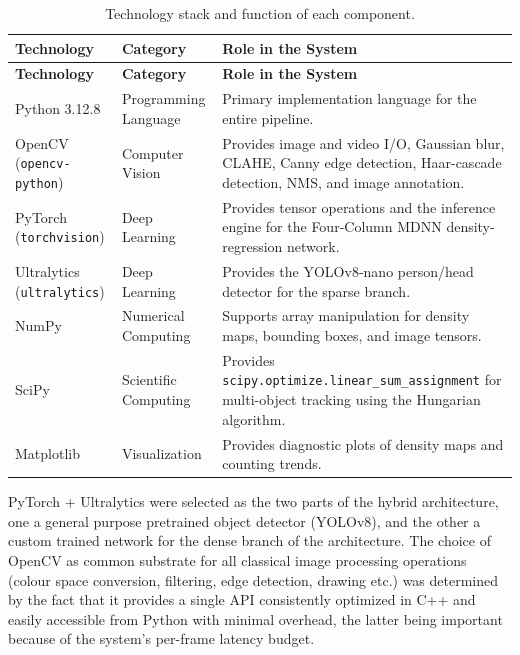 \begin{longtable}{|
		>{\raggedright\arraybackslash}p{2.8cm}|
		>{\raggedright\arraybackslash}p{2.8cm}|
		>{\raggedright\arraybackslash}p{7.6cm}|
	}
	\caption{Technology stack and function of each component.}
	\label{tab:techstack} \\
	\hline
	\textbf{Technology} & \textbf{Category} & \textbf{Role in the System} \\
	\hline
	\endfirsthead
	
	\hline
	\textbf{Technology} & \textbf{Category} & \textbf{Role in the System} \\
	\hline
	\endhead
	
	Python 3.12.8 &
	Programming Language &
	Primary implementation language for the entire pipeline. \\
	\hline
	
	OpenCV (\texttt{opencv-python}) &
	Computer Vision &
	Provides image and video I/O, Gaussian blur, CLAHE, Canny edge detection, Haar-cascade detection, NMS, and image annotation. \\
	\hline
	
	PyTorch (\texttt{torchvision}) &
	Deep Learning &
	Provides tensor operations and the inference engine for the Four-Column MDNN density-regression network. \\
	\hline
	
	Ultralytics (\texttt{ultralytics}) &
	Deep Learning &
	Provides the YOLOv8-nano person/head detector for the sparse branch. \\
	\hline
	
	NumPy &
	Numerical Computing &
	Supports array manipulation for density maps, bounding boxes, and image tensors. \\
	\hline
	
	SciPy &
	Scientific Computing &
	Provides \texttt{scipy.optimize.linear\_sum\_assignment} for multi-object tracking using the Hungarian algorithm. \\
	\hline
	
	Matplotlib &
	Visualization &
	Provides diagnostic plots of density maps and counting trends. \\
	\hline
	
\end{longtable}

PyTorch + Ultralytics were selected as the two parts of the hybrid architecture, one a general purpose pretrained object detector (YOLOv8), and the other a custom trained network for the dense branch of the architecture. The choice of OpenCV as common substrate for all classical image processing operations (colour space conversion, filtering, edge detection, drawing etc.) was determined by the fact that it provides a single API consistently optimized in C++ and easily accessible from Python with minimal overhead, the latter being important because of the system's per-frame latency budget.


